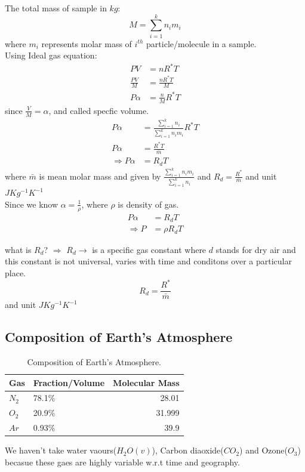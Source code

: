 \documentclass[fleqn,10pt]{SelfArx} %
\begin{document}
The total mass of sample in $kg$:
\begin{equation}
    M=\sum^k_{i=1}n_im_i
\end{equation}
where $m_i$ represents molar mass of $i^{th}$ particle/molecule in a sample.\\
Using Ideal gas equation:
\begin{align}
    PV&=nR^*T \\
    \frac{PV}{M} &= \frac{nR^*T}{M} \\    
    P \alpha &= \frac{n}{M} R^* T
\end{align}
since $\frac{V}{M} = \alpha$, and called specfic volume.
\begin{align}
    P \alpha &= \frac{\sum^k_{i=1}n_i}{\sum^k_{i=1}n_im_i} R^* T \\
    P \alpha &= \frac{R^* T}{\bar{m}} \\
    \Rightarrow P \alpha &= R_d T
\end{align}
where $\bar{m}$ is mean molar mass and given by $\frac{\sum^k_{i=1}n_im_i}{\sum^k_{i=1}n_i}$ and $R_d = \frac{R^*}{\bar{m}}$ and unit $JKg^{-1}K^{-1}$ \\

Since we know $\alpha = \frac{1}{\rho}$, where $\rho$ is density of gas. 
\begin{align}
    P \alpha &= R_dT \\
    \Rightarrow P &= \rho R_d T   \label{IdealGasequation}
\end{align}

\begin{question}[label={q:3.2}]{what is $R_d$?}
    $\Rightarrow$ $R_d \rightarrow$ is a specific gas constant where $d$ stands for dry air and this constant is not universal, varies with time and conditons over a particular place.  
    $$R_d = \frac{R^*}{\bar{m}}$$ and unit $JKg^{-1}K^{-1}$
\end{question}

\subsection{Composition of Earth's Atmosphere}

\begin{table}[hbt]
	\centering
	\begin{tabular}{llr}
		\toprule
		Gas & Fraction/Volume & Molecular Mass\\
		\midrule
		$N_2$ & 78.1\% & 28.01 \\
		$O_2$ & 20.9\% & 31.999 \\
		$Ar$ & 0.93\% & 39.9 \\
		\bottomrule
	\end{tabular}
	\label{Composition of Earth Atmosphere}
	\caption{Composition of Earth's Atmosphere.}
\end{table}
We haven't take water vaours($H_2O(v)$), Carbon diaoxide($CO_2$) and Ozone($O_3$) becasue these gaes are highly variable w.r.t time and geography.
\end{document}
